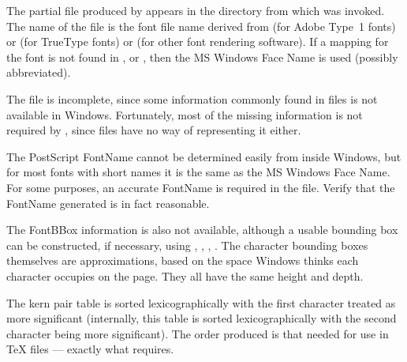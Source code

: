 

The partial {\AFM} file produced by  
appears in the directory from which {\DVIWindo} was invoked.  
The name of the file is the font file name
derived from {\ATMINI} (for Adobe Type~1 fonts) or {\WININI} 
(for True\-Type fonts) or   
(for other font rendering software).  If a mapping for the font is not found
in {\ATMINI}, {\WININI} or , 
then the MS Windows Face Name is used (possibly abbreviated).

The {\AFM} file is incomplete, since some information commonly found in 
{\AFM} files is not available in Windows.  
Fortunately, most of the missing information is not required by {\AFMTOTFM},
since {\TFM} files have no way of representing it either.

The PostScript FontName cannot be determined easily from inside
Windows, but for most fonts with short names it is the same as the MS
Windows Face Name.  
For some purposes,  an accurate FontName is required in the {\AFM} file.  
Verify that the FontName generated is in fact reasonable.

The FontBBox information is also not available, although a usable
bounding box can be constructed, if necessary, 
using , , 
, . 
%
The character bounding boxes themselves are approximations, based on
the space Windows thinks each character occupies on the page.  
They all have the same height and depth.

The kern pair table is sorted lexicographically with the first character
treated as more significant (internally, this table is sorted
lexicographically with the second character being more significant).
The order produced is that needed for use in {\TeX} {\TFM} files ---
exactly what {\AFMTOTFM} requires. 

